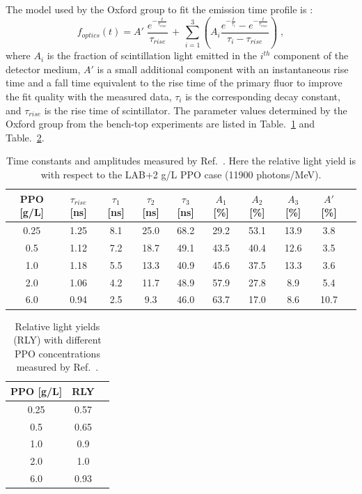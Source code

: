 The model used by the Oxford group to fit the emission time profile is \cite{oxfordMeasurement}: 
\begin{equation}
f_{optics}(t)= A' \; \frac{e^{-\frac{t}{\tau_{rise}}}}{\tau_{rise}} \, + \, \sum_{i=1}^3 (A_i\frac{e^{-\frac{t}{\tau_i}}-e^{-\frac{t}{\tau_{rise}}}}{\tau_i-\tau_{rise}}) \; ,
\end{equation}
where $A_i$ is the fraction of scintillation light emitted in the $i^{th}$ component of the detector medium, $A'$ is a small additional component with an instantaneous rise time and a
fall time equivalent to the rise time of the primary fluor to improve the fit quality with the measured data, $\tau_i$ is the corresponding decay constant, and $\tau_{rise}$ is the rise time of scintillator. The parameter values determined by the Oxford group from the bench-top experiments are listed in Table.~\ref{tab:oxfordMeasure} and Table.~\ref{tab:oxfordMeasure2}.

\begin{table}[ht]
	\centering
	\caption[Time constants and amplitudes measured by Oxford.]{\label{tab:oxfordMeasure} Time constants and amplitudes measured by Ref.~\cite{oxfordMeasurement}. Here the relative light yield is with respect to the LAB+2 g/L PPO case (11900 photons/MeV).}	
	{\centering
		\begin{tabular*}{160mm}{c@{\extracolsep{\fill}}ccccccccc}
			\toprule 
			PPO [g/L] & $\tau_{rise}$ [ns] & $\tau_1$ [ns] & $\tau_2$ [ns] & $\tau_3$ [ns] & $A_1$ [\%]  & $A_2$ [\%]   & $A_3$ [\%]  & $A'$ [\%] \\
			\midrule
			0.25 & 1.25 & 8.1 & 25.0 & 68.2 & 29.2 & 53.1 & 13.9 & 3.8\\
			0.5  & 1.12 & 7.2 & 18.7 & 49.1 & 43.5 & 40.4 & 12.6 & 3.5 \\
			1.0 & 1.18 & 5.5 & 13.3 & 40.9 & 45.6 & 37.5 & 13.3 & 3.6 \\
			2.0 & 1.06 & 4.2 & 11.7 & 48.9 & 57.9 & 27.8 & 8.9 & 5.4	\\
			6.0 & 0.94 & 2.5 & 9.3  & 46.0 & 63.7 & 17.0 & 8.6 & 10.7\\
			\bottomrule	
		\end{tabular*}
	}
\end{table}

\begin{table}[ht]
	\centering
	\caption[Relative light yields with different PPO concentrations.]{Relative light yields (RLY) with different PPO concentrations measured by Ref.~\cite{oxfordMeasurement}.\label{tab:oxfordMeasure2}}	
	{\centering
		\begin{tabular*}{60mm}{c@{\extracolsep{\fill}}cc}
			\toprule 
			PPO [g/L] & RLY \\
			\midrule
			0.25 & 0.57\\
			0.5 & 0.65\\
			1.0 & 0.9\\
			2.0 & 1.0\\
			6.0 & 0.93\\
			\bottomrule	
		\end{tabular*}
	}
\end{table}

